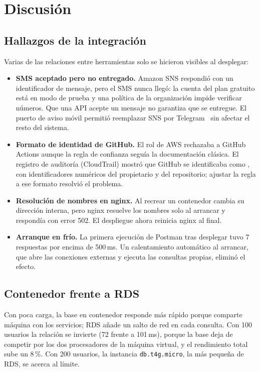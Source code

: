 \documentclass[conference]{IEEEtran}
\begin{document}
\section{Discusión}\label{sec:discusion}
\subsection{Hallazgos de la integración}
Varias de las relaciones entre herramientas solo se hicieron visibles al desplegar:
\begin{itemize}
\item \textbf{SMS aceptado pero no entregado.} Amazon SNS respondió con un identificador de mensaje, pero el SMS nunca llegó: la cuenta del plan gratuito está en modo de prueba y una política de la organización impide verificar números. Que una API acepte un mensaje no garantiza que se entregue. El puerto de aviso móvil permitió reemplazar SNS por Telegram~\cite{telegram} sin afectar el resto del sistema.
\item \textbf{Formato de identidad de GitHub.} El rol de AWS rechazaba a GitHub Actions aunque la regla de confianza seguía la documentación clásica. El registro de auditoría (CloudTrail) mostró que GitHub se identificaba como , con identificadores numéricos del propietario y del repositorio; ajustar la regla a ese formato resolvió el problema.
\item \textbf{Resolución de nombres en nginx.} Al recrear un contenedor cambia su dirección interna, pero nginx resuelve los nombres solo al arrancar y respondía con error 502. El despliegue ahora reinicia nginx al final.
\item \textbf{Arranque en frío.} La primera ejecución de Postman tras desplegar tuvo 7 respuestas por encima de 500\,ms. Un calentamiento automático al arrancar, que abre las conexiones externas y ejecuta las consultas propias, eliminó el efecto.
\end{itemize}

\subsection{Contenedor frente a RDS}
Con poca carga, la base en contenedor responde más rápido porque comparte máquina con los servicios; RDS añade un salto de red en cada consulta. Con 100 usuarios la relación se invierte (72 frente a 101\,ms), porque la base deja de competir por los dos procesadores de la máquina virtual, y el rendimiento total sube un 8\,\%. Con 200 usuarios, la instancia \texttt{db.t4g.micro}, la más pequeña de RDS, se acerca al límite.
\end{document}
